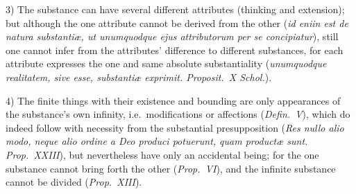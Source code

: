 \documentclass[12pt]{book}
\begin{document}
3) The substance can have several different attributes (thinking and
extension); but although the one attribute cannot be derived from the other
(\textit{id eniin est de natura substantiæ, ut unumquodque ejus attributorum
per se concipiatur}), still one cannot infer from the attributes' difference
to different substances, for each attribute expresses the one and same
absolute substantiality (\textit{unumquodque realitatem, sive esse,
substantiæ exprimit. Proposit.\ X Schol.}).

4) The finite things with their existence and bounding are only appearances
of the substance's own infinity, i.e.\ modifications or affections
(\textit{Defin.\ V}), which do indeed follow with necessity from the
substantial presupposition (\textit{Res nullo alio modo, neque alio ordine a
Deo produci potuerunt, quam productæ sunt. Prop.\ XXIII}), but nevertheless
have only an accidental being; for the one substance cannot bring forth the
other (\textit{Prop.\ VI}), and the infinite substance cannot be divided
(\textit{Prop.\ XIII}).
\end{document}
